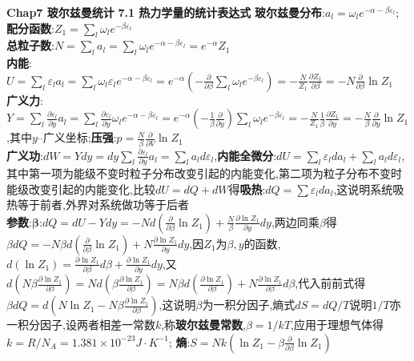 \documentclass[10pt,a4paper]{article}
\begin{document}
\tiny
\begin{multicols}{2}
\noindent\textbf{Chap7 玻尔兹曼统计}
\textbf{7.1 热力学量的统计表达式}
\textbf{玻尔兹曼分布}:$a_l=\omega_le^{-\alpha-\beta\varepsilon_l}$;
\textbf{配分函数}:$Z_1=\sum_l\omega_le^{-\beta\varepsilon_l}$\\
\textbf{总粒子数}:$N=\sum_la_l=\sum_l\omega_le^{-\alpha-\beta\varepsilon_l}=e^{-\alpha}Z_1$\\
\textbf{内能}:$U=\sum_l\varepsilon_la_l=\sum_l\omega_l\varepsilon_le^{-\alpha-\beta\varepsilon_l}=e^{-\alpha}\left(-\frac{\partial}{\partial\beta}\sum_l\omega_le^{-\beta\varepsilon_l}\right)=-\frac{N}{Z_1}\frac{\partial Z_1}{\partial\beta}=-N\frac{\partial}{\partial\beta}\ln Z_1$\\
\textbf{广义力}:$Y=\sum_l\frac{\partial\varepsilon_l}{\partial y}a_l=\sum_l\frac{\partial\varepsilon_l}{\partial y}\omega_le^{-\alpha-\beta\varepsilon_l}=e^{-\alpha}\left(-\frac{1}{\beta}\frac{\partial}{\partial y}\right)\sum_l\omega_le^{-\beta\varepsilon_l}=-\frac{N}{Z_1}\frac{1}{\beta}\frac{\partial Z_1}{\partial y}=-\frac{N}{\beta}\frac{\partial}{\partial y}\ln Z_1$,其中$y$--广义坐标;\textbf{压强}:$p=\frac{N}{\beta}\frac{\partial}{\partial V}\ln Z_1$\\
\textbf{广义功}:$dW=Ydy=dy\sum_l\frac{\partial\varepsilon_l}{\partial y}a_l=\sum_la_ld\varepsilon_l$,\textbf{内能全微分}:$dU=\sum_l\varepsilon_lda_l+\sum_la_ld\varepsilon_l$,其中第一项为能级不变时粒子分布改变引起的内能变化,第二项为粒子分布不变时能级改变引起的内能变化,比较$dU=dQ+dW$得\textbf{吸热}:$dQ=\sum\varepsilon_lda_l$,这说明系统吸热等于前者,外界对系统做功等于后者\\
\textbf{参数}:$\bm{\beta}$:$dQ=dU-Ydy=-Nd\left(\frac{\partial}{\partial\beta}\ln Z_1\right)+\frac{N}{\beta}\frac{\partial\ln Z_1}{\partial y}dy$,两边同乘$\beta$得$\beta dQ=-N\beta d\left(\frac{\partial}{\partial\beta}\ln Z_1\right)+N\frac{\partial\ln Z_1}{\partial y}dy$,因$Z_1$为$\beta,y$的函数,$d(\ln Z_1)=\frac{\partial\ln Z_1}{\partial\beta}d\beta+\frac{\partial\ln Z_1}{\partial y}dy$,又$d\left(N\beta\frac{\partial\ln Z_1}{\partial\beta}\right)=Nd\left(\beta\frac{\partial\ln Z_1}{\partial\beta}\right)=N\beta d\left(\frac{\partial\ln Z_1}{\partial\beta}\right)+N\frac{\partial\ln Z_1}{\partial\beta}d\beta$,代入前前式得$\beta dQ=d\left(N\ln Z_1-N\beta\frac{\partial\ln Z_1}{\partial\beta}\right)$,这说明$\beta$为一积分因子,熵式$dS=dQ/T$说明$1/T$亦一积分因子,设两者相差一常数$k$,称\textbf{玻尔兹曼常数},$\beta=1/kT$,应用于理想气体得$k=R/N_A=1.381\times10^{-23}J\cdot K^{-1}$;
\textbf{熵}:$S=Nk\left(\ln Z_1-\beta\frac{\partial}{\partial\beta}\ln Z_1\right)$\\

\end{multicols}
\end{document}
